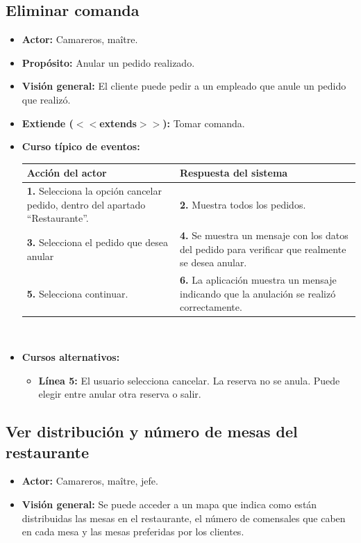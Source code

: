 \documentclass[spanish,a4paper,11pt, twoside]{report}	%
\begin{document}
		\subsection{Eliminar comanda}
			\begin{itemize}
			\item \textbf{Actor:} Camareros, maître.
			\item \textbf{Propósito: } Anular un pedido realizado.
			\item \textbf{Visión general:} El cliente puede pedir a un empleado que anule un pedido que realizó.
			\item \textbf{Extiende ($<<$extends$>>$):} Tomar comanda.
			\item \textbf{Curso típico de eventos:} 	\\
			\begin{tabular}{|p{6cm}||p{6cm}|}
				\hline
				\textbf{Acción del actor} & \textbf{Respuesta del sistema} \\ \hline \hline
				\textbf{1.} Selecciona la opción cancelar pedido, dentro del apartado ``Restaurante''. & 
				\textbf{2.} Muestra todos los pedidos. \\ \hline
				\textbf{3.} Selecciona el pedido que desea anular	& 
				\textbf{4.} Se muestra un mensaje con los datos del pedido para verificar que realmente se desea anular. \\ \hline
				\textbf{5.} Selecciona continuar.	& 
				\textbf{6.} La aplicación muestra un mensaje indicando que la anulación se realizó correctamente. \\ \hline
			\end{tabular}
			\\
			\item \textbf{Cursos alternativos:} 
			\begin{itemize}
			\item  \textbf{Línea 5:} El usuario selecciona cancelar. La reserva no se anula. 
				Puede elegir entre anular otra reserva o salir.
			\end {itemize}
		\end {itemize}
		


			
		\subsection{Ver distribución y número de mesas del restaurante}
			\begin{itemize}
				\item \textbf{Actor:} Camareros, maître, jefe.
				\item \textbf{Visión general:} Se puede acceder a un mapa que indica como están
					distribuidas las mesas en el restaurante, el número de comensales que caben en
					cada mesa y las mesas preferidas por los clientes.
			\end {itemize}
\end{document}
